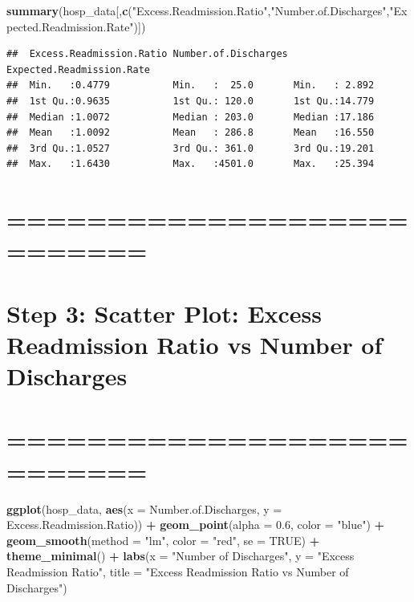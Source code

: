 \documentclass[
]{article}
\newenvironment{Shaded}{\begin{snugshade}}{\end{snugshade}}
\newcommand{\AttributeTok}[1]{\textcolor[rgb]{0.13,0.29,0.53}{#1}}
\newcommand{\ConstantTok}[1]{\textcolor[rgb]{0.56,0.35,0.01}{#1}}
\newcommand{\FloatTok}[1]{\textcolor[rgb]{0.00,0.00,0.81}{#1}}
\newcommand{\FunctionTok}[1]{\textcolor[rgb]{0.13,0.29,0.53}{\textbf{#1}}}
\newcommand{\NormalTok}[1]{#1}
\newcommand{\SpecialCharTok}[1]{\textcolor[rgb]{0.81,0.36,0.00}{\textbf{#1}}}
\newcommand{\StringTok}[1]{\textcolor[rgb]{0.31,0.60,0.02}{#1}}
\begin{document}
\begin{Shaded}
\begin{Highlighting}[]
\FunctionTok{summary}\NormalTok{(hosp\_data[,}\FunctionTok{c}\NormalTok{(}\StringTok{"Excess.Readmission.Ratio"}\NormalTok{,}\StringTok{"Number.of.Discharges"}\NormalTok{,}\StringTok{"Expected.Readmission.Rate"}\NormalTok{)])}
\end{Highlighting}
\end{Shaded}

\begin{verbatim}
##  Excess.Readmission.Ratio Number.of.Discharges Expected.Readmission.Rate
##  Min.   :0.4779           Min.   :  25.0       Min.   : 2.892           
##  1st Qu.:0.9635           1st Qu.: 120.0       1st Qu.:14.779           
##  Median :1.0072           Median : 203.0       Median :17.186           
##  Mean   :1.0092           Mean   : 286.8       Mean   :16.550           
##  3rd Qu.:1.0527           3rd Qu.: 361.0       3rd Qu.:19.201           
##  Max.   :1.6430           Max.   :4501.0       Max.   :25.394
\end{verbatim}

\section{===========================}\label{section-4}

\section{Step 3: Scatter Plot: Excess Readmission Ratio vs Number of
Discharges}\label{step-3-scatter-plot-excess-readmission-ratio-vs-number-of-discharges}

\section{===========================}\label{section-5}

\begin{Shaded}
\begin{Highlighting}[]
\FunctionTok{ggplot}\NormalTok{(hosp\_data, }\FunctionTok{aes}\NormalTok{(}\AttributeTok{x =}\NormalTok{ Number.of.Discharges, }\AttributeTok{y =}\NormalTok{ Excess.Readmission.Ratio)) }\SpecialCharTok{+}
\FunctionTok{geom\_point}\NormalTok{(}\AttributeTok{alpha =} \FloatTok{0.6}\NormalTok{, }\AttributeTok{color =} \StringTok{"blue"}\NormalTok{) }\SpecialCharTok{+}
\FunctionTok{geom\_smooth}\NormalTok{(}\AttributeTok{method =} \StringTok{"lm"}\NormalTok{, }\AttributeTok{color =} \StringTok{"red"}\NormalTok{, }\AttributeTok{se =} \ConstantTok{TRUE}\NormalTok{) }\SpecialCharTok{+}
\FunctionTok{theme\_minimal}\NormalTok{() }\SpecialCharTok{+}
\FunctionTok{labs}\NormalTok{(}\AttributeTok{x =} \StringTok{"Number of Discharges"}\NormalTok{, }\AttributeTok{y =} \StringTok{"Excess Readmission Ratio"}\NormalTok{,}
\AttributeTok{title =} \StringTok{"Excess Readmission Ratio vs Number of Discharges"}\NormalTok{)}
\end{Highlighting}
\end{Shaded}
\end{document}
